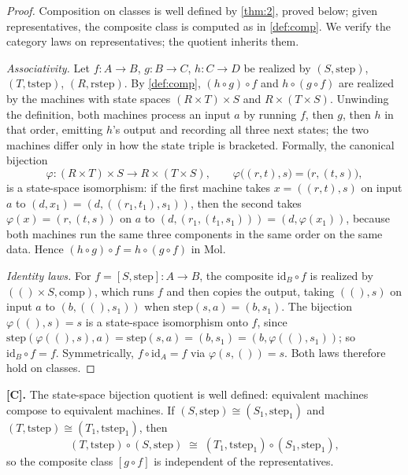 \begin{proof}
Composition on classes is well defined by \autoref{thm:2}, proved below; given
representatives, the composite class is computed as in \autoref{def:comp}. We
verify the category laws on representatives; the quotient inherits them.

\emph{Associativity.} Let $f : A \to B$, $g : B \to C$, $h : C \to D$ be
realized by $(S, \mathrm{step})$, $(T, \mathrm{tstep})$,
$(R, \mathrm{rstep})$. By \autoref{def:comp}, $(h \circ g) \circ f$ and
$h \circ (g \circ f)$ are realized by the machines with state spaces
$(R \times T) \times S$ and $R \times (T \times S)$. Unwinding the definition,
both machines process an input $a$ by running $f$, then $g$, then $h$ in that
order, emitting $h$'s output and recording all three next states; the two
machines differ only in how the state triple is bracketed. Formally, the
canonical bijection
\[ \varphi : (R \times T) \times S \to R \times (T \times S),
   \qquad \varphi\bigl ((r, t), s\bigr) = \bigl (r, (t, s)\bigr) , \]
is a state-space isomorphism: if the first machine takes
$x = ((r, t), s)$ on input $a$ to $(d, x_1) = (d, ((r_1, t_1), s_1))$, then
the second takes $\varphi (x) = (r, (t, s))$ on $a$ to
$(d, (r_1, (t_1, s_1))) = (d, \varphi (x_1))$, because both machines run the
same three components in the same order on the same data. Hence
$(h \circ g) \circ f = h \circ (g \circ f)$ in Mol.

\emph{Identity laws.} For $f = [S, \mathrm{step}] : A \to B$, the composite
$\mathrm{id}_B \circ f$ is realized by $(() \times S, \mathrm{comp})$, which
runs $f$ and then copies the output, taking $((), s)$ on input $a$ to
$(b, ((), s_1))$ when $\mathrm{step} (s, a) = (b, s_1)$. The bijection
$\varphi ((), s) = s$ is a state-space isomorphism onto $f$, since
$\mathrm{step} (\varphi ((), s), a) = \mathrm{step} (s, a) = (b, s_1) =
(b, \varphi ((), s_1))$; so $\mathrm{id}_B \circ f = f$. Symmetrically,
$f \circ \mathrm{id}_A = f$ via $\varphi (s, ()) = s$. Both laws therefore
hold on classes.
\end{proof}

\begin{theorem}\label{thm:2}
\textbf{[C].} The state-space bijection quotient is well defined: equivalent
machines compose to equivalent machines. If
$(S, \mathrm{step}) \cong (S_1, \mathrm{step}_1)$ and
$(T, \mathrm{tstep}) \cong (T_1, \mathrm{tstep}_1)$, then
\[ (T, \mathrm{tstep}) \circ (S, \mathrm{step})
   \;\cong\; (T_1, \mathrm{tstep}_1) \circ (S_1, \mathrm{step}_1) , \]
so the composite class $[g \circ f]$ is independent of the representatives.
\end{theorem}

